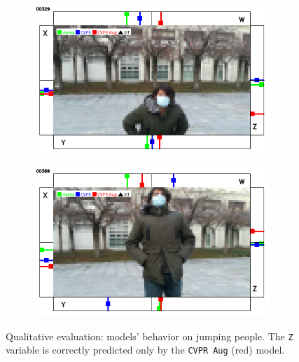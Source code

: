 \begin{figure}[H]
\begin{center}
\begin{subfigure}[h]{0.49\textwidth}
		\end{subfigure}
		\vfill
		\begin{subfigure}[h]{0.49\textwidth}
			\centering
			\includegraphics[width=0.98\textwidth]{"contents/images/qualitative-videos/jump2-square02-329"}
		\end{subfigure}
		\hfill
		\begin{subfigure}[h]{0.49\textwidth}
			\centering
			\includegraphics[width=0.98\textwidth]{"contents/images/qualitative-videos/jump2-square02-369"}
		\end{subfigure}
	\end{center}
	\vspace{-0.5cm}
	\caption[Qualitative evaluation: models' behavior on jumping people]{Qualitative evaluation: models' behavior on jumping people. The \texttt{Z} variable is correctly predicted only by the \texttt{CVPR Aug} (red) model.}
	\label{fig:ql-sim-jump}
\end{figure}

